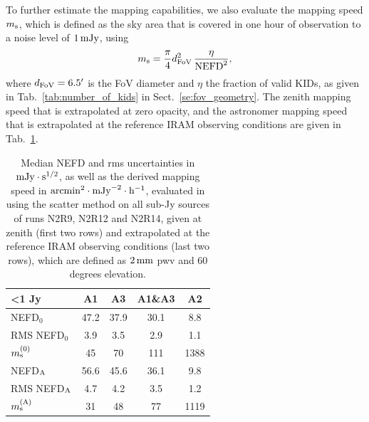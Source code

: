 To further estimate the mapping capabilities, we also evaluate the
mapping speed $m_{\rm{s}}$, which is defined as the sky area that is covered in one
hour of observation to a noise level of $1\,\rm{mJy}$, using
\begin{equation}
m_{\rm{s}} = \frac{\pi}{4} d_{\rm{FoV}}^2 \, \frac{\eta}{\rm{NEFD}^2},
\end{equation}
where $d_{\rm{FoV}} = 6.5'$ is the FoV diameter and $\eta$ the
fraction of valid KIDs, as given in Tab.~\ref{tab:number_of_kids} in
Sect.~\ref{se:fov_geometry}.
The zenith mapping speed that is extrapolated at zero opacity, and the astronomer
mapping speed that is extrapolated at the reference IRAM observing conditions are
given in Tab.~\ref{tab:nefd_astro}.   

\begin{table}
\begin{center}
\begin{tabular}{|l|c|c|c|c|}
  \hline
 <1 Jy               & A1      &   A3    &   A1\&A3 &    A2    \\  
\hline\hline
NEFD$_0$             & 47.2    & 37.9    &    30.1  &    8.8   \\
RMS NEFD$_0$         &  3.9    &  3.5    &     2.9  &    1.1   \\
$m_{\rm{s}}^{(0)}$     & 45      &  70     &    111   &   1388   \\
\hline
NEFD$_{\rm{A}}$        & 56.6    & 45.6    &    36.1  &    9.8   \\
RMS NEFD$_{\rm{A}}$    &  4.7    & 4.2     &     3.5  &    1.2   \\
$m_{\rm{s}}^{(\rm{A})}$  &  31    & 48       &    77   &   1119   \\
\hline
\hline
\end{tabular}
\caption[NEFD estimates on all sub-Jy sources]{Median NEFD and rms
uncertainties in $\rm{mJy}\cdot \rm{s}^{1/2}$, as well as the derived mapping
speed in $\rm{arcmin}^2\cdot\rm{mJy}^{-2}\cdot\rm{h}^{-1}$, evaluated
in using the scatter method on all sub-Jy sources of runs N2R9, N2R12
and N2R14, given at zenith (first two rows) and extrapolated at the
reference IRAM observing conditions (last two rows), which are defined
as $2\,\rm{mm}$ pwv and 60 degrees elevation.}
\label{tab:nefd_astro}
\end{center}
\end{table}



